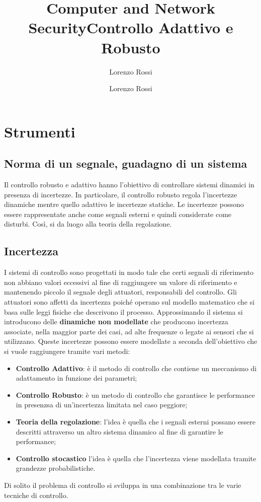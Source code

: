 \documentclass{book}
\title{Computer and Network Security}
\author{Lorenzo Rossi}
\title{Controllo Adattivo e Robusto}
\author{Lorenzo Rossi}
\begin{document}
\theoremstyle{definition}

\maketitle
\tableofcontents
\newpage
\section{Strumenti}
\subsection{Norma di un segnale, guadagno di un sistema}
Il controllo robusto e adattivo hanno l'obiettivo di controllare sistemi dinamici in presenza di incertezze. In particolare, il controllo robusto regola l'incertezze dinamiche mentre quello adattivo le incertezze statiche.
Le incertezze possono essere rappresentate anche come segnali esterni e quindi considerate come disturbi. Così, si da luogo alla teoria della regolazione.
\subsection{Incertezza}
I sistemi di controllo sono progettati in modo tale che certi segnali di riferimento non abbiano valori eccessivi al fine di raggiungere un valore di riferimento e mantenendo piccolo il segnale degli attuatori, responsabili del controllo. Gli attuatori sono affetti da incertezza poiché operano sul modello matematico che si basa sulle leggi fisiche che descrivono il processo.
Approssimando il sistema si introducono delle \textbf{dinamiche non modellate} che producono incertezza associate, nella maggior parte dei casi, ad alte frequenze o legate ai sensori che si utilizzano.
Queste incertezze possono essere modellate a seconda dell'obiettivo che si vuole raggiungere tramite vari metodi:
\begin{itemize}
    \item \textbf{Controllo Adattivo}: è il metodo di controllo che contiene un meccanismo di adattamento in funzione dei parametri;
    \item \textbf{Controllo Robusto}: è un metodo di controllo che garantisce le performance in presenzsa di un'incertezza limitata nel caso peggiore;
    \item\textbf{Teoria della regolazione}: l'idea è quella che i segnali esterni possano essere descritti attraverso un altro sistema dinamico al fine di garantire le performance;
    \item\textbf{Controllo stocastico} l'idea è quella che l'incertezza viene modellata tramite grandezze probabilistiche.
\end{itemize}
Di solito il problema di controllo si sviluppa in una combinazione tra le varie tecniche di controllo.
\end{document}
